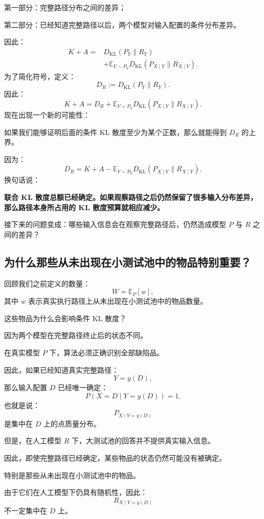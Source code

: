 \documentclass[UTF8,11pt]{ctexart}
\begin{document}
第一部分：完整路径分布之间的差异；

第二部分：已经知道完整路径以后，两个模型对输入配置的条件分布差异。

因此：
\begin{equation}
\boxed{\begin{aligned}
K+A={}&D_{\mathrm{KL}}(P_Y\|R_Y)\\
&+\mathbb E_{Y\sim P_Y}D_{\mathrm{KL}}(P_{X\mid Y}\|R_{X\mid Y}).
\end{aligned}}
\tag{33}
\end{equation}
为了简化符号，定义：
\begin{equation}\boxed{D_R:=D_{\mathrm{KL}}(P_Y\|R_Y).}\tag{34}\end{equation}
因此：
\[K+A=D_R+\mathbb E_{Y\sim P_Y}D_{\mathrm{KL}}(P_{X\mid Y}\|R_{X\mid Y}).\]
现在出现一个新的可能性：

如果我们能够证明后面的条件 KL 散度至少为某个正数，那么就能得到 $D_R$ 的上界。

因为：
\[D_R=K+A-\mathbb E_{Y\sim P_Y}D_{\mathrm{KL}}(P_{X\mid Y}\|R_{X\mid Y}).\]
换句话说：

\textbf{联合 KL 散度总额已经确定。如果观察路径之后仍然保留了很多输入分布差异，那么路径本身所占用的 KL 散度预算就相应减少。}

接下来的问题变成：哪些输入信息会在观察完整路径后，仍然造成模型 $P$ 与 $R$ 之间的差异？

\subsection{为什么那些从未出现在小测试池中的物品特别重要？}
回顾我们之前定义的数量：
\[W=\mathbb E_P[w],\]
其中 $w$ 表示真实执行路径上从未出现在小测试池中的物品数量。

这些物品为什么会影响条件 KL 散度？

因为两个模型在完整路径终止后的状态不同。

在真实模型 $P$ 下，算法必须正确识别全部缺陷品。

因此，如果已经知道真实完整路径：
\[Y=y(D),\]
那么输入配置 $D$ 已经唯一确定：
\[P(X=D\mid Y=y(D))=1.\]
也就是说：
\[P_{X\mid Y=y(D)}\]
是集中在 $D$ 上的点质量分布。

但是，在人工模型 $R$ 下，大测试池的回答并不提供真实输入信息。

因此，即使完整路径已经确定，某些物品的状态仍然可能没有被确定。

特别是那些从未出现在小测试池中的物品。

由于它们在人工模型下仍具有随机性，因此：
\[R_{X\mid Y=y(D)}\]
不一定集中在 $D$ 上。
\end{document}

